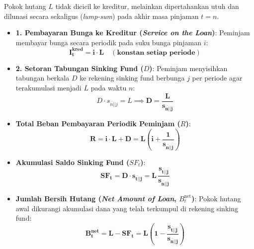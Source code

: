 \documentclass[10pt,a4paper]{article}
\newcommand{\angl}[1]{\overline{#1|}}
\begin{document}
\begin{rumusbox}
Pokok hutang $L$ tidak dicicil ke kreditur, melainkan dipertahankan utuh dan dilunasi secara sekaligus (\textit{lump-sum}) pada akhir masa pinjaman $t = n$.
\begin{itemize}[leftmargin=1.5em, topsep=1.5pt, itemsep=2pt]
    \item \textbf{1. Pembayaran Bunga ke Kreditur (\textit{Service on the Loan})}:
    Peminjam membayar bunga secara periodik pada suku bunga pinjaman $i$:
    \begin{equation*}
        \mathbf{I_t^{\text{kred}} = i \cdot L \quad (\text{konstan setiap periode})}
    \end{equation*}
    \item \textbf{2. Setoran Tabungan Sinking Fund ($D$)}:
    Peminjam menyisihkan tabungan berkala $D$ ke rekening sinking fund berbunga $j$ per periode agar terakumulasi menjadi $L$ pada waktu $n$:
    \begin{equation*}
        D \cdot s_{\angl{n}|j} = L \implies \mathbf{D = \frac{L}{s_{\angl{n}|j}}}
    \end{equation*}
    \item \textbf{Total Beban Pembayaran Periodik Peminjam ($R$)}:
    \begin{equation*}
        \mathbf{R = i \cdot L + D = L \left( i + \frac{1}{s_{\angl{n}|j}} \right)}
    \end{equation*}
    \item \textbf{Akumulasi Saldo Sinking Fund ($SF_t$)}:
    \begin{equation*}
        \mathbf{SF_t = D \cdot s_{\angl{t}|j} = L \, \frac{s_{\angl{t}|j}}{s_{\angl{n}|j}}}
    \end{equation*}
    \item \textbf{Jumlah Bersih Hutang (\textit{Net Amount of Loan}, $B_t^{\text{net}}$)}:
    Pokok hutang awal dikurangi akumulasi dana yang telah terkumpul di rekening sinking fund:
    \begin{equation*}
        \mathbf{B_t^{\text{net}} = L - SF_t = L \left( 1 - \frac{s_{\angl{t}|j}}{s_{\angl{n}|j}} \right)}
    \end{equation*}
\end{itemize}
\end{rumusbox}
\end{document}
